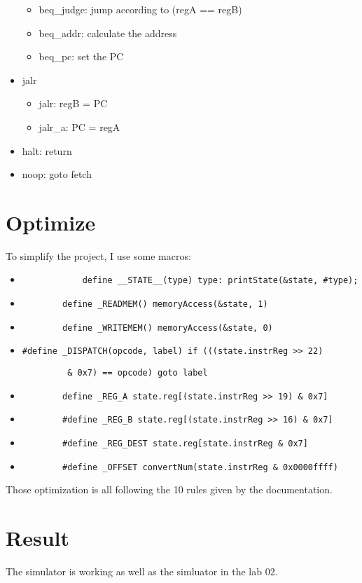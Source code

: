 \documentclass[a4paper]{article}
\begin{document}
\begin{itemize}
\begin{itemize}
	    			\item beq\_judge: jump according to (regA == regB)
	    			\item beq\_addr: calculate the address
	    			\item beq\_pc: set the PC
	    		\end{itemize}
	    	\item jalr
	    		\begin{itemize}
	    			\item jalr: regB = PC
	    			\item jalr\_a: PC = regA
	    		\end{itemize}
	    	\item halt: return
	    	\item noop: goto fetch
	\end{itemize}
\section{Optimize}
	To simplify the project, I use some macros:
	\begin{itemize}
		\item \begin{verbatim}
			define __STATE__(type) type: printState(&state, #type);
		\end{verbatim}
		\item \begin{verbatim}
		define _READMEM() memoryAccess(&state, 1)
		\end{verbatim}
		\item \begin{verbatim}
		define _WRITEMEM() memoryAccess(&state, 0)
		\end{verbatim}
		\item \begin{verbatim}#define _DISPATCH(opcode, label) if (((state.instrReg >> 22) 
		\end{verbatim}
		\begin{verbatim}
		 & 0x7) == opcode) goto label
		\end{verbatim}
		\item \begin{verbatim}
		define _REG_A state.reg[(state.instrReg >> 19) & 0x7]
		\end{verbatim}

		\item \begin{verbatim}
		#define _REG_B state.reg[(state.instrReg >> 16) & 0x7]
\end{verbatim}				
		\item \begin{verbatim}
		#define _REG_DEST state.reg[state.instrReg & 0x7]
\end{verbatim}						
		\item \begin{verbatim}
		#define _OFFSET convertNum(state.instrReg & 0x0000ffff)
\end{verbatim}				
	\end{itemize}\par
	Those optimization is all following the 10 rules given by the documentation.
	
\section{Result}
	The simulator is working as well as the simluator in the lab 02.
\end{document}
